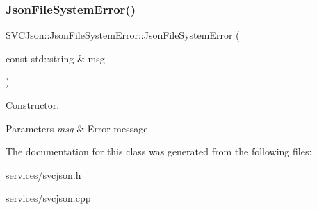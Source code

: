 \subsubsection{\texorpdfstring{JsonFileSystemError()}{JsonFileSystemError()}}
{\footnotesize\ttfamily S\+V\+C\+Json\+::\+Json\+File\+System\+Error\+::\+Json\+File\+System\+Error (\begin{DoxyParamCaption}\item[{const std\+::string \&}]{msg }\end{DoxyParamCaption})}



Constructor. 


\begin{DoxyParams}{Parameters}
{\em msg} & Error message. \\
\hline
\end{DoxyParams}


The documentation for this class was generated from the following files\+:\begin{DoxyCompactItemize}
\item 
services/svcjson.\+h\item 
services/svcjson.\+cpp\end{DoxyCompactItemize}
